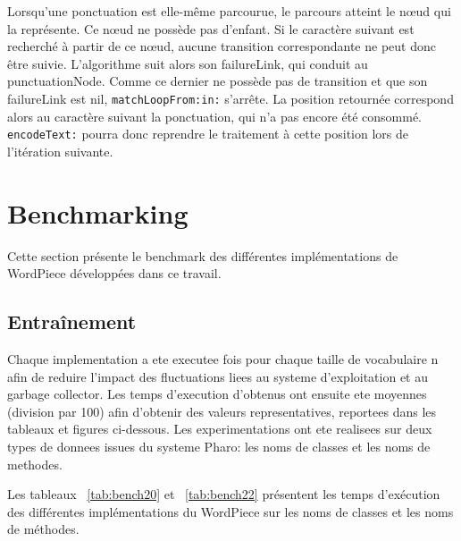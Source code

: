\documentclass[12pt,a4paper]{report}
\begin{document}
	Lorsqu'une ponctuation est elle-même parcourue, le parcours atteint le nœud qui la représente. Ce nœud ne possède pas d'enfant. Si le caractère suivant est recherché à partir de ce nœud, aucune transition correspondante ne peut donc être suivie. L'algorithme suit alors son failureLink, qui conduit au punctuationNode. Comme ce dernier ne possède pas de transition et que son failureLink est nil, \texttt{matchLoopFrom:in:} s'arrête. La position retournée correspond alors au caractère suivant la ponctuation, qui n'a pas encore été consommé. \texttt{encodeText:} pourra donc reprendre le traitement à cette position lors de l'itération suivante.
	
	\section{Benchmarking}
	
	Cette section présente le benchmark des différentes implémentations de WordPiece développées dans ce travail.
	
	\subsection{Entraînement}
	
	Chaque implementation a ete executee  fois pour chaque taille de vocabulaire n afin de reduire l'impact des fluctuations liees au systeme d'exploitation et au garbage collector.
	Les temps d'execution d'obtenus ont ensuite ete moyennes (division par 100) afin d'obtenir des valeurs representatives, reportees dans les tableaux et figures ci-dessous.
	Les experimentations ont ete realisees sur deux types de donnees issues du systeme Pharo: les noms de classes et les noms de methodes.
	
	Les tableaux ~\ref{tab:bench20} et ~\ref{tab:bench22} présentent les temps d’exécution des différentes implémentations du WordPiece sur les noms de classes et les noms de méthodes.
	
	\begin{table}[h]
		\centering
		\caption{Benchmark des temps d’entraînement des implémentations du WordPiece sur les noms de classes de Pharo en fonction de la taille du vocabulaire $n$.}
		\label{tab:bench20}
	\end{table}
	\FloatBarrier
	
\end{document}
